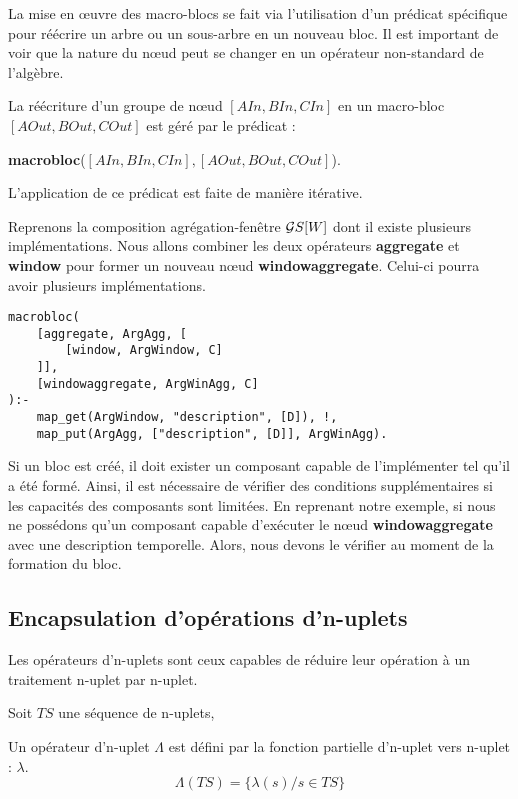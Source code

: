 La mise en œuvre des macro-blocs se fait via l'utilisation d'un prédicat spécifique pour réécrire un arbre ou un sous-arbre en un nouveau bloc. Il est important de voir que la nature du nœud peut se changer en un opérateur non-standard de l'algèbre.
\begin{regle}
La réécriture d'un groupe de nœud $[AIn,BIn,CIn]$ en un macro-bloc $[AOut,BOut,COut]$ est géré par le prédicat :
\begin{center} \textbf{macrobloc}($[AIn,BIn,CIn],[AOut,BOut,COut]$).\end{center}
L'application de ce prédicat est faite de manière itérative.
\end{regle}
\begin{example}
    Reprenons la composition agrégation-fenêtre $\mathcal{G} S[W]$ dont il existe plusieurs implémentations. Nous allons combiner les deux opérateurs \textbf{aggregate} et \textbf{window} pour former un nouveau nœud \textbf{windowaggregate}. Celui-ci pourra avoir plusieurs implémentations.
    \begin{lstlisting}
macrobloc(
    [aggregate, ArgAgg, [
        [window, ArgWindow, C]
    ]], 
    [windowaggregate, ArgWinAgg, C]
):-
    map_get(ArgWindow, "description", [D]), !,
    map_put(ArgAgg, ["description", [D]], ArgWinAgg). 
    \end{lstlisting}
\end{example}
Si un bloc est créé, il doit exister un composant capable de l'implémenter tel qu'il a été formé. Ainsi, il est nécessaire de vérifier des conditions supplémentaires si les capacités des composants sont limitées. En reprenant notre exemple, si nous ne possédons qu'un composant capable d'exécuter le nœud \textbf{windowaggregate} avec une description temporelle. Alors, nous devons le vérifier au moment de la formation du bloc.

\subsection{Encapsulation d'opérations d'n-uplets}
Les opérateurs d'n-uplets sont ceux capables de réduire leur opération à un traitement n-uplet par n-uplet.
\begin{defi}\label{def:operateurtuple}
    Soit $TS$ une séquence de n-uplets,

    Un opérateur d'n-uplet $\Lambda$ est défini par la fonction partielle d'n-uplet vers n-uplet : $\lambda$.
    $$\Lambda(TS) = \{\lambda(s) / s \in TS \}$$
\end{defi}

